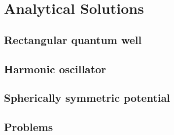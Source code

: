 \section{Analytical Solutions}
	\subsection{Rectangular quantum well}
	\subsection{Harmonic oscillator}
	\subsection{Spherically symmetric potential}
	\subsection{Problems}